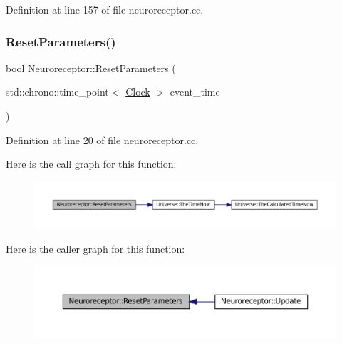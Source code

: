 Definition at line 157 of file neuroreceptor.\+cc.

\mbox{\label{class_neuroreceptor_a30debeb0311d92eb6abe354409c15d09}} 
\subsubsection{\texorpdfstring{Reset\+Parameters()}{ResetParameters()}}
{\footnotesize\ttfamily bool Neuroreceptor\+::\+Reset\+Parameters (\begin{DoxyParamCaption}\item[{std\+::chrono\+::time\+\_\+point$<$ \mbox{\hyperlink{universe_8h_a0ef8d951d1ca5ab3cfaf7ab4c7a6fd80}{Clock}} $>$}]{event\+\_\+time }\end{DoxyParamCaption})}



Definition at line 20 of file neuroreceptor.\+cc.

Here is the call graph for this function\+:\nopagebreak
\begin{figure}[H]
\begin{center}
\leavevmode
\includegraphics[width=350pt]{class_neuroreceptor_a30debeb0311d92eb6abe354409c15d09_cgraph}
\end{center}
\end{figure}
Here is the caller graph for this function\+:\nopagebreak
\begin{figure}[H]
\begin{center}
\leavevmode
\includegraphics[width=350pt]{class_neuroreceptor_a30debeb0311d92eb6abe354409c15d09_icgraph}
\end{center}
\end{figure}
\mbox{\label{class_neuroreceptor_a0660a316ef44cf723509f720acd16f24}} 
